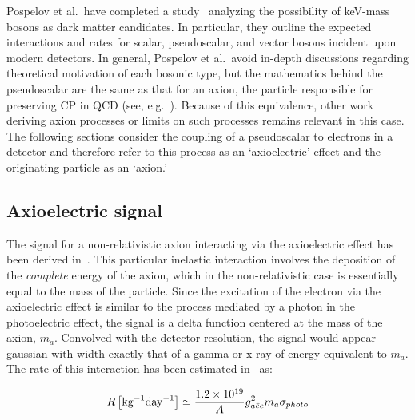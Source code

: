 	Pospelov et al.~have completed a study~\cite{Pospelov:2008jk} analyzing the possibility of keV-mass bosons as dark matter candidates.  In particular, they outline the expected interactions and rates for scalar, pseudoscalar, and vector bosons incident upon modern detectors.  In general, Pospelov et al.~avoid in-depth discussions regarding theoretical motivation of each bosonic type, but the mathematics behind the pseudoscalar are the same as that for an axion, the particle responsible for preserving CP in QCD (see, e.g.~\cite{Amsler20081}).  Because of this equivalence, other work deriving axion processes or limits on such processes remains relevant in this case.  The following sections consider the coupling of a pseudoscalar to electrons in a detector and therefore refer to this process as an `axioelectric' effect and the originating particle as an `axion.'  

	\subsection{Axioelectric signal}
	\label{sec:CalcLimitsOnHeavyAxionSignal}		

	The signal for a non-relativistic axion interacting via the axioelectric effect has been derived in~\cite{Pospelov:2008jk}.  This particular inelastic interaction involves the deposition of the \emph{complete} energy of the axion, which in the non-relativistic case is essentially equal to the mass of the particle.  Since the excitation of the electron via the axioelectric effect is similar to the process mediated by a photon in the photoelectric effect, the signal is a delta function centered at the mass of the axion, $m_{a}$.  Convolved with the detector resolution, the signal would appear gaussian with width exactly that of a gamma or x-ray of energy equivalent to $m_{a}$.  The rate of this interaction has been estimated in~\cite{Pospelov:2008jk} as:
	
		\begin{equation}
			R \left[ \text{kg}^{-1} \text{day}^{-1} \right]\simeq \frac{1.2\times 10^{19}}{A} g_{a\bar{e}e}^{2} m_a \sigma_{photo}
			\label{eqn:AxioelectricRate}
		\end{equation}

